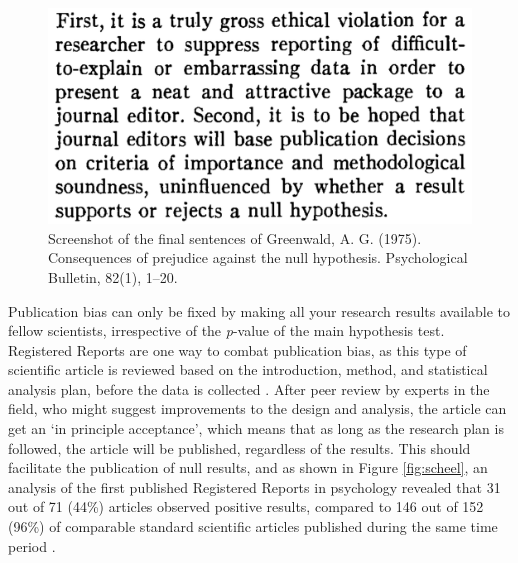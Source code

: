 \documentclass[
  oneside]{book}
\begin{document}
\begin{figure}

{\centering \includegraphics[width=1\linewidth]{images/greenwald} 

}

\caption{Screenshot of the final sentences of Greenwald, A. G. (1975). Consequences of prejudice against the null hypothesis. Psychological Bulletin, 82(1), 1--20.}\label{fig:greenwald}
\end{figure}

Publication bias can only be fixed by making all your research results available to fellow scientists, irrespective of the \emph{p}-value of the main hypothesis test. Registered Reports are one way to combat publication bias, as this type of scientific article is reviewed based on the introduction, method, and statistical analysis plan, before the data is collected \citep{chambers_past_2022, nosek_registered_2014}. After peer review by experts in the field, who might suggest improvements to the design and analysis, the article can get an `in principle acceptance', which means that as long as the research plan is followed, the article will be published, regardless of the results. This should facilitate the publication of null results, and as shown in Figure \ref{fig:scheel}, an analysis of the first published Registered Reports in psychology revealed that 31 out of 71 (44\%) articles observed positive results, compared to 146 out of 152 (96\%) of comparable standard scientific articles published during the same time period \citep{scheel_excess_2021}.
\end{document}
